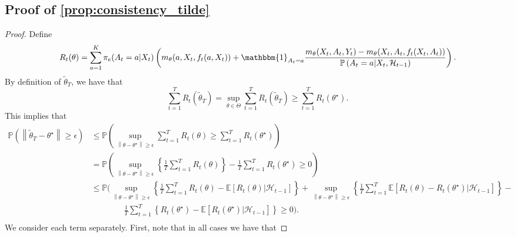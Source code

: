 \documentclass[11pt]{article}
\newcommand{\norm}[1]{\left\lVert#1\right\rVert}
\begin{document}
\begin{appendix}
\subsection{Proof of \cref{prop:consistency_tilde}}
\begin{proof}
Define 
\begin{equation*} 
R_{t}(\theta) =  \sum_{a=1}^{K} \pi_{e}(A_{t} =a | X_{t}) \left( m_{\theta}(a,X_{t},f_{t}(a,X_{t}))   + \mathbbm{1}_{A_{t} = a} \frac{ m_{\theta}(X_{t},A_{t},Y_{t})  -  m_{\theta}(X_{t},A_{t},f_{t}(X_{t},A_{t})) }{ \mathbb{P} \left(A_{t} =a | X_{t},\mathcal{H}_{t-1} \right)  }\right).
\end{equation*}
By definition of $\tilde{\theta}_{T}$, we have that 
$$ \sum_{t=1}^{T} R_{t}(\tilde{\theta}_{T}) = \sup_{\theta \in \Theta} \sum_{t=1}^{T}  R_{t}(\tilde{\theta}_{T})\ge \sum_{t=1}^{T} R_{t}(\theta^{\star}).$$
This implies that
\begin{align*}
    \mathbb{P} \left( \norm{\tilde{\theta}_{T} - \theta^{\star}} \ge \epsilon \right) 
    &\le\mathbb{P} \left( \sup_{\norm{\theta- \theta^{\star}} \ge \epsilon} 
    \sum_{t=1}^{T} R_{t}(\theta)  \ge \sum_{t=1}^{T} R_{t}(\theta^{\star})    \right) \\
    &= \mathbb{P} \left( \sup_{\norm{\theta- \theta^{\star}} \ge \epsilon} 
\left\{\frac{1}{T}\sum_{t=1}^{T} R_{t}(\theta) \right\} - \frac{1}{T}\sum_{t=1}^{T} R_{t}(\theta^{\star}) \ge 0\right) \\
    &\le \mathbb{P}  \Bigg( \sup_{\norm{\theta- \theta^{\star}} \ge \epsilon} \left\{  
    \frac{1}{T} \sum_{t=1}^{T} R_{t}(\theta) - \mathbb{E}\left[R_{t}(\theta) | \mathcal{H}_{t-1} \right] \right\}   +  \sup_{\norm{\theta- \theta^{\star}} \ge \epsilon} \left\{ \frac{1}{T} \sum_{t=1}^{T} \mathbb{E}\left[ R_{t}(\theta) - R_{t}(\theta^{\star})| \mathcal{H}_{t-1} \right]  \right\} - \\ 
    &\qquad \qquad \frac{1}{T} \sum_{t=1}^{T} \left\{R_{t}(\theta^{\star}) - \mathbb{E} \left[R_{t}(\theta^{\star}) | \mathcal{H}_{t-1} \right]\right\} \ge 0  \Bigg).\\
\end{align*}
We consider each term separately. First, note that in all cases we have that


\end{proof}
\end{appendix}
\end{document}
